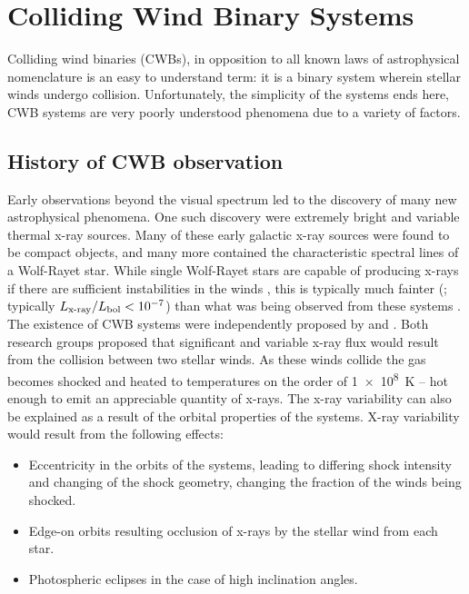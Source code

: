 \section{Colliding Wind Binary Systems}
\label{sec:cwb}

Colliding wind binaries (CWBs), in opposition to all known laws of astrophysical nomenclature is an easy to understand term: it is a binary system wherein stellar winds undergo collision.
Unfortunately, the simplicity of the systems ends here, CWB systems are very poorly understood phenomena due to a variety of factors.

\subsection{History of CWB observation}


Early observations beyond the visual spectrum led to the discovery of many new astrophysical phenomena.
One such discovery were extremely bright and variable thermal x-ray sources.
Many of these early galactic x-ray sources were found to be compact objects, and many more contained the characteristic spectral lines of a Wolf-Rayet star.
While single Wolf-Rayet stars are capable of producing x-rays if there are sufficient instabilities in the winds \parencite{gossetXMMNewtonLookWolfRayet2005}, this is typically much fainter (\cite{nazeNewXrayDetections2021}; typically $L_\text{x-ray} / L_\text{bol} < 10^{-7}$) than what was being observed from these systems
\parencite{sewardXraysEtaCarinae1979,oskinovaXrayEmissionSingle2015,rauwXrayEmissionMassive2022}.
The existence of CWB systems were independently proposed by \textcite{prilutskii_x_1976} and \textcite{cherepashchukDetectabilityWolfRayetBinaries1976}. 
Both research groups proposed that significant and variable x-ray flux would result from the collision between two stellar winds.
As these winds collide the gas becomes shocked and heated to temperatures on the order of \SI{1e8}{\kelvin} -- hot enough to emit an appreciable quantity of x-rays.
The x-ray variability can also be explained as a result of the orbital properties of the systems.
X-ray variability would result from the following effects:

\begin{itemize}
  \item Eccentricity in the orbits of the systems, leading to differing shock intensity and changing of the shock geometry, changing the fraction of the winds being shocked.
  \item Edge-on orbits resulting occlusion of x-rays by the stellar wind from each star. 
  \item Photospheric eclipses in the case of high inclination angles.
\end{itemize}

